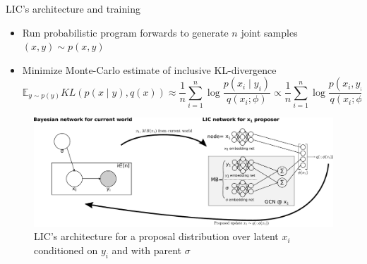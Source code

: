 \documentclass[final]{beamer}
\newlength{\twocolwid}
\begin{document}
\begin{frame}[t,containsverbatim]
\begin{columns}[t]
\begin{column}{\twocolwid}


      \begin{block}{LIC's architecture and training}
        \begin{itemize}
          \item Run probabilistic program forwards to generate $n$ joint samples $(x,y) \sim p(x,y)$
          \item Minimize Monte-Carlo estimate of inclusive KL-divergence
                \[
                  \mathbb{E}_{y \sim p(y)} KL(p(x \mid y), q(x))
                  \approx \frac{1}{n} \sum_{i=1}^n \log \frac{p(x_i \mid y_i)}{q(x_i;\phi)}
                  \propto \frac{1}{n} \sum_{i=1}^n \log \frac{p(x_i, y_i)}{q(x_i;\phi)}
                \]
        \end{itemize}
        \begin{figure}
          \includegraphics[width=0.75\linewidth]{../Figures/lic_overview.pdf}
          \caption{LIC's architecture for a proposal distribution over
            latent $x_i$ conditioned on $y_i$ and with parent $\sigma$}
        \end{figure}
      \end{block}
      \vspace{-2cm}


\end{column}
\end{columns}
\end{frame}
\end{document}
